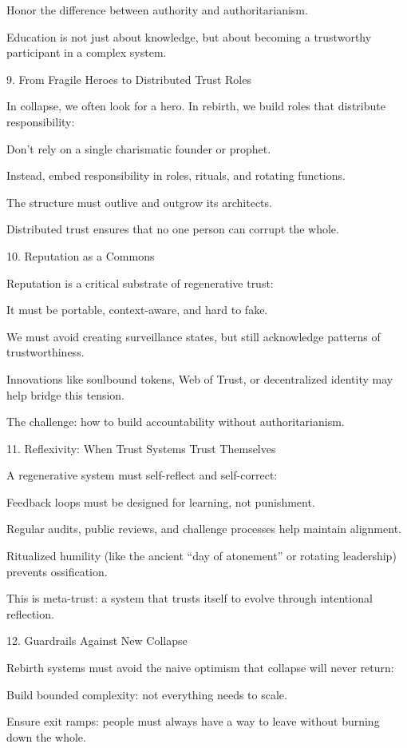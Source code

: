 \documentclass[11pt,oneside]{book}
\begin{document}
    Honor the difference between authority and authoritarianism.

Education is not just about knowledge, but about becoming a trustworthy participant in a complex system.

9. From Fragile Heroes to Distributed Trust Roles


In collapse, we often look for a hero. In rebirth, we build roles that distribute responsibility:

    Don't rely on a single charismatic founder or prophet.

    Instead, embed responsibility in roles, rituals, and rotating functions.

    The structure must outlive and outgrow its architects.

Distributed trust ensures that no one person can corrupt the whole.

10. Reputation as a Commons


Reputation is a critical substrate of regenerative trust:

    It must be portable, context-aware, and hard to fake.

    We must avoid creating surveillance states, but still acknowledge patterns of trustworthiness.

    Innovations like soulbound tokens, Web of Trust, or decentralized identity may help bridge this tension.

The challenge: how to build accountability without authoritarianism.

11. Reflexivity: When Trust Systems Trust Themselves


A regenerative system must self-reflect and self-correct:

    Feedback loops must be designed for learning, not punishment.

    Regular audits, public reviews, and challenge processes help maintain alignment.

    Ritualized humility (like the ancient “day of atonement” or rotating leadership) prevents ossification.

This is meta-trust: a system that trusts itself to evolve through intentional reflection.

12. Guardrails Against New Collapse


Rebirth systems must avoid the naive optimism that collapse will never return:

    Build bounded complexity: not everything needs to scale.

    Ensure exit ramps: people must always have a way to leave without burning down the whole.
\end{document}
